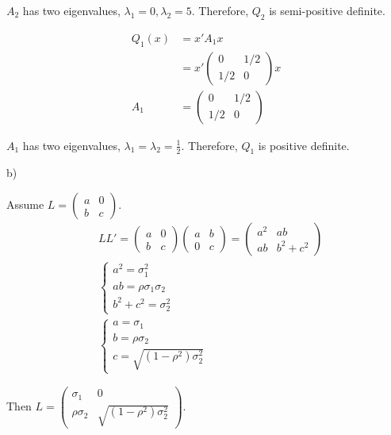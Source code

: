 \documentclass[letterpaper, 11pt]{article}
\newcommand{\1}{\mathds{1}}	%
\theoremstyle{definition}
\begin{document}
$A_{2} $ has two eigenvalues, $\lambda_{1} = 0, \lambda_{2}=5$. Therefore, $Q_{2}$ is semi-positive definite.

\begin{align*}
    Q_{1}(x) & =x'A_{1}x          \\
             & = x'\begin{pmatrix}
                       0   & 1/2 \\
                       1/2 & 0
                   \end{pmatrix}x \\
    A_{1}    & =\begin{pmatrix}
                    0   & 1/2 \\
                    1/2 & 0
                \end{pmatrix}
\end{align*}

$A_{1}$ has two eigenvalues, $\lambda_{1}=\lambda_{2}=\frac{1}{2}$. Therefore, $Q_{1}$ is positive definite.


b)

Assume $L = \begin{pmatrix}
        a & 0 \\
        b & c
    \end{pmatrix}$.
\begin{align*}
     & LL' = \begin{pmatrix}
                 a & 0 \\
                 b & c
             \end{pmatrix}\begin{pmatrix}
                              a & b \\
                              0 & c
                          \end{pmatrix} = \begin{pmatrix}
                                              a ^{2} & ab            \\
                                              ab     & b ^{2}+c ^{2}
                                          \end{pmatrix}        \\
     & \left\{\begin{array}{l}
                  a ^{2} = \sigma_{1}^{2}       \\
                  ab = \rho\sigma_{1}\sigma_{2} \\
                  b ^{2}+ c ^{2} = \sigma_{2}^{2}
              \end{array}\right.                            \\
     & \left\{\begin{array}{l}
                  a = \sigma_{1}     \\
                  b = \rho\sigma_{2} \\
                  c =\sqrt{(1-\rho ^{2})\sigma_{2}^{2}}
              \end{array}\right.
\end{align*}

Then $L = \begin{pmatrix}
        \sigma_{1}     & 0                                  \\
        \rho\sigma_{2} & \sqrt{(1-\rho ^{2})\sigma_{2}^{2}}
    \end{pmatrix}$.

\end{document}
